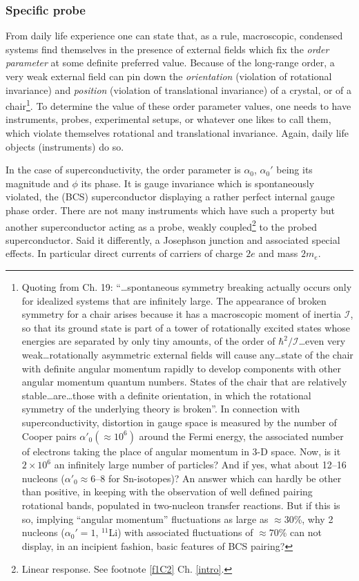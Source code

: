 \subsubsection{Specific probe}
From daily life experience one can state that, as a rule, macroscopic, condensed systems find themselves in the presence of external fields which fix the \textit{order parameter} at some definite preferred value. Because of the long-range order, a very weak external field can pin down the \textit{orientation} (violation of rotational invariance) and \textit{position} (violation of translational invariance) of a crystal, or of a chair\footnote{Quoting from \cite{Weinberg:96b} Ch. 19: ``\dots spontaneous symmetry breaking actually occurs only for idealized systems that are infinitely large. The appearance of broken symmetry for a chair arises because it has a macroscopic moment of inertia $\mathcal I$, so that its ground state is part of a tower of rotationally excited states whose energies are separated by only tiny amounts, of the order of $\hbar^2/\mathcal I$\dots even very weak\dots rotationally asymmetric external fields will cause any\dots state of the chair with definite angular momentum rapidly to develop components with other angular momentum quantum numbers. States of the chair that are relatively stable\dots are\dots those with a definite orientation, in which the rotational symmetry of the underlying theory is broken''. In connection with superconductivity, distortion in gauge space is measured by the number of Cooper pairs $\alpha'_0(\approx10^6)$ around the Fermi energy, the associated number of electrons taking the place of angular momentum in 3-D space. Now, is it $2\times10^6$ an infinitely large number of particles? And if yes, what about 12--16 nucleons ($\alpha'_0\approx6$--8 for Sn-isotopes)? An answer which can hardly be other than positive, in keeping with the observation of well defined pairing rotational bands, populated in two-nucleon transfer reactions. But if this is so, implying ``angular momentum'' fluctuations as large as $\approx30$\%, why 2 nucleons ($\alpha_0'=1$, $^{11}$Li) with associated fluctuations of $\approx70$\% can not display, in an incipient fashion, basic features of BCS pairing?}.  To determine the value of these order parameter values, one needs to have instruments, probes, experimental setups, or whatever one likes to call them, which violate themselves rotational and translational invariance. Again, daily life objects (instruments) do so.


In the case of superconductivity, the order parameter is $\alpha_0$, $\alpha_0'$ being its magnitude and $\phi$ its phase. It is gauge invariance which is spontaneously violated, the (BCS) superconductor displaying a rather perfect internal gauge phase order. There are not many instruments which have such a property but another superconductor acting as a probe, weakly coupled\footnote{Linear response. See footnote \ref{f1C2} Ch. \ref{intro}.} to the probed superconductor. Said it differently, a Josephson junction and associated special effects. In particular direct currents of carriers of charge $2e$ and mass $2m_e$.


